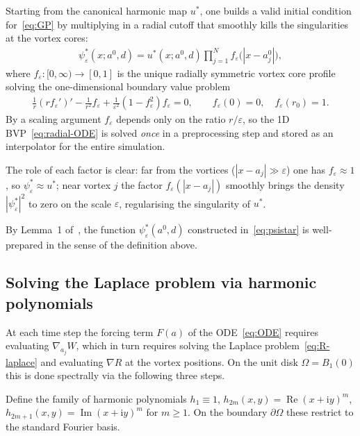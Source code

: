 \documentclass[12pt, a4paper]{article}
\theoremstyle{plain}
\theoremstyle{definition}
\newcommand{\psistar}{\psi^*_\varepsilon}
\newcommand{\abs}[1]{\left\lvert #1 \right\rvert}
\begin{document}
Starting from the canonical harmonic map $u^*$, one builds a valid
initial condition for~\eqref{eq:GP} by multiplying in a radial cutoff
that smoothly kills the singularities at the vortex cores:
\begin{align}
  \psistar(x; a^0, d)
  = u^*(x; a^0, d)\prod_{j=1}^N f_\varepsilon\!\bigl(\abs{x - a_j^0}\bigr),
  \label{eq:psistar}
\end{align}
where $f_\varepsilon\colon [0,\infty) \to [0,1]$ is the unique radially symmetric
vortex core profile solving the one-dimensional boundary value problem
\begin{align}
  \frac{1}{r}(r f_\varepsilon')' - \frac{1}{r^2}f_\varepsilon
  + \frac{1}{\varepsilon^2}(1 - f_\varepsilon^2)f_\varepsilon = 0,
  \qquad f_\varepsilon(0) = 0,\quad f_\varepsilon(r_0) = 1.
  \label{eq:radial-ODE}
\end{align}
By a scaling argument $f_\varepsilon$ depends only on the ratio $r/\varepsilon$,
so the 1D BVP~\eqref{eq:radial-ODE} is solved \emph{once} in a preprocessing step
and stored as an interpolator for the entire simulation.

The role of each factor is clear:
far from the vortices ($\abs{x-a_j} \gg \varepsilon$) one has $f_\varepsilon \approx 1$,
so $\psistar \approx u^*$;
near vortex $j$ the factor $f_\varepsilon(\abs{x-a_j})$ smoothly brings
the density $\abs{\psistar}^2$ to zero on the scale $\varepsilon$,
regularising the singularity of $u^*$.

By Lemma~1 of~\cite{JerrardSpirnRefined2008}, the function
$\psistar(a^0,d)$ constructed in~\eqref{eq:psistar} is well-prepared
in the sense of the definition above.

\subsection{Solving the Laplace problem via harmonic polynomials}

At each time step the forcing term $F(a)$ of the ODE~\eqref{eq:ODE} requires
evaluating $\nabla_{a_j}W$, which in turn requires solving the Laplace
problem~\eqref{eq:R-laplace} and evaluating $\nabla R$ at the vortex positions.
On the unit disk $\Omega = B_1(0)$ this is done spectrally via
the following three steps.

Define the family of harmonic polynomials
$h_1 \equiv 1$, $h_{2m}(x,y) = \operatorname{Re}(x+\mathrm{i}y)^m$,
$h_{2m+1}(x,y) = \operatorname{Im}(x+\mathrm{i}y)^m$
for $m \ge 1$.
On the boundary $\partial\Omega$ these restrict to the standard Fourier basis.
\end{document}
